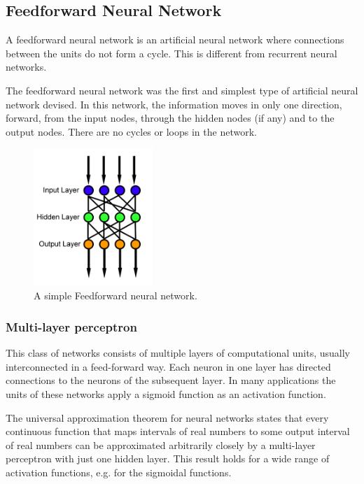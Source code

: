 \documentclass[14pt,a4paper]{extarticle}
\begin{document}
	\subsection{Feedforward Neural Network}
	
	A feedforward neural network is an artificial neural network where connections between the units do not form a cycle. This is different from recurrent neural networks.

The feedforward neural network was the first and simplest type of artificial neural network devised. In this network, the information moves in only one direction, forward, from the input nodes, through the hidden nodes (if any) and to the output nodes. There are no cycles or loops in the network.

		\begin{figure}[H]
			\includegraphics[width=0.4\textwidth, center]{Feed_forward_neural_net.png}
			\caption{A simple Feedforward neural network.}
		\end{figure}
		
		
		\subsubsection{Multi-layer perceptron}
		This class of networks consists of multiple layers of computational units, usually interconnected in a feed-forward way. Each neuron in one layer has directed connections to the neurons of the subsequent layer. In many applications the units of these networks apply a sigmoid function as an activation function.

The universal approximation theorem for neural networks states that every continuous function that maps intervals of real numbers to some output interval of real numbers can be approximated arbitrarily closely by a multi-layer perceptron with just one hidden layer. This result holds for a wide range of activation functions, e.g. for the sigmoidal functions.
\end{document}
